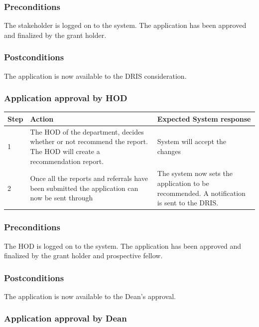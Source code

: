 \documentclass[12pt]{article}
\begin{document}
\subsubsection*{Preconditions}
The stakeholder is logged on to the system. The application has been approved and finalized by the grant holder.

\subsubsection*{Postconditions}
The application is now available to the DRIS consideration.

\subsubsection{Application approval by HOD}

\begin{center}
\begin{tabular}{|l|p{6cm}|p{8cm}|}
\hline
Step & Action & Expected System response \\
\hline
1 & The HOD of the department, decides whether or not recommend the report. The HOD will create a recommendation report. & System will accept the changes \\
\hline
2 & Once all the reports and referrals have been submitted the application can now be sent through  & The system now sets the application to be recommended. A notification is sent to the DRIS. \\
\hline
\end{tabular}
\end{center}

\subsubsection*{Preconditions}
The HOD is logged on to the system. The application has been approved and finalized by the grant holder and prospective fellow.

\subsubsection*{Postconditions}
The application is now available to the Dean's approval.

\subsubsection{Application approval by Dean}
\end{document}
